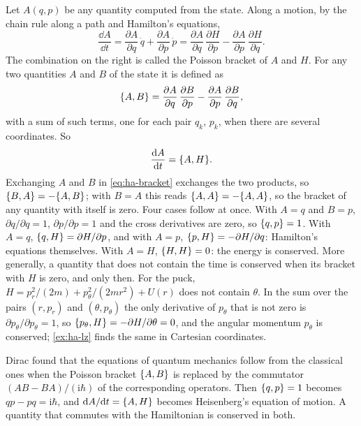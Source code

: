 Let $A(q, p)$ be any quantity computed from the state. Along a motion, by
the chain rule along a path and Hamilton's equations,
\begin{equation*}
   \frac{\dd A}{\dd t} = \frac{\partial A}{\partial q}\,\dot{q}
   + \frac{\partial A}{\partial p}\,\dot{p}
   = \frac{\partial A}{\partial q}\,\frac{\partial H}{\partial p}
   - \frac{\partial A}{\partial p}\,\frac{\partial H}{\partial q} .
\end{equation*}
The combination on the right is called the Poisson bracket of $A$ and
$H$. For any two quantities $A$ and $B$ of the state it is defined as
\begin{equation}
   \{A, B\} = \frac{\partial A}{\partial q}\,\frac{\partial B}{\partial p}
   - \frac{\partial A}{\partial p}\,\frac{\partial B}{\partial q} ,
   \label{eq:ha-bracket}
\end{equation}
with a sum of such terms, one for each pair $q_k$, $p_k$, when there are
several coordinates. So
\begin{equation*}
   \frac{\mathrm{d} A}{\mathrm{d} t} = \{A, H\} .
\end{equation*}
Exchanging $A$ and $B$ in \cref{eq:ha-bracket} exchanges the two
products, so $\{B, A\} = -\{A, B\}$; with $B = A$ this reads $\{A, A\}
= -\{A, A\}$, so the bracket of any quantity with itself is zero. Four cases follow at once. With $A = q$ and $B = p$,
$\partial q/\partial q = 1$, $\partial p/\partial p = 1$ and the cross
derivatives are zero, so $\{q, p\} = 1$. With $A = q$, $\{q, H\} =
\partial H/\partial p$, and with $A = p$, $\{p, H\} = -\partial H/
\partial q$: Hamilton's equations themselves. With $A = H$, $\{H, H\} =
0$: the energy is conserved. More generally, a quantity that does not
contain the time is conserved when its bracket with $H$ is zero, and only
then.
For the puck, $H = p_r^2/(2m) + p_\theta^2/(2mr^2) + U(r)$ does not contain
$\theta$. In the sum over the pairs $(r, p_r)$ and $(\theta, p_\theta)$
the only derivative of $p_\theta$ that is not zero is $\partial p_\theta/
\partial p_\theta = 1$, so $\{p_\theta, H\} = -\partial H/\partial\theta =
0$, and the
angular momentum $p_\theta$ is conserved; \cref{ex:ha-lz} finds the same in
Cartesian coordinates.

\begin{bridge}
Dirac found that the equations of quantum mechanics follow from the
classical ones when the Poisson bracket $\{A, B\}$ is replaced by the
commutator $(AB - BA)/(\mathrm{i}\hbar)$ of the corresponding
operators\cite{Dirac1925}. Then $\{q, p\} = 1$ becomes $qp - pq =
\mathrm{i}\hbar$, and $\mathrm{d} A/\mathrm{d} t = \{A, H\}$ becomes Heisenberg's
equation of motion. A quantity that commutes with the Hamiltonian is
conserved in both.
\end{bridge}


